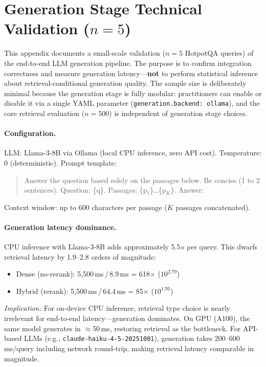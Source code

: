\documentclass[11pt,a4paper]{article}
\begin{document}


\section{Generation Stage Technical Validation ($n = 5$)}
\label{app:generation_pilot}

This appendix documents a small-scale validation ($n = 5$ HotpotQA queries)
of the end-to-end LLM generation pipeline.
The purpose is to confirm integration correctness and measure generation
latency---\textbf{not} to perform statistical inference about
retrieval-conditional generation quality.
The sample size is deliberately minimal because the generation stage is fully
modular: practitioners can enable or disable it via a single YAML parameter
(\texttt{generation.backend: ollama}), and the core retrieval evaluation
($n = 500$) is independent of generation stage choices.

\paragraph{Configuration.}
LLM: Llama-3-8B via Ollama (local CPU inference, zero API cost).
Temperature: 0 (deterministic).
Prompt template:
\begin{quote}\small\ttfamily
Answer the question based solely on the passages below.
Be concise (1 to 2 sentences).
Question: \{q\}. Passages: \{p$_1$\}\ldots\{p$_K$\}. Answer:
\end{quote}
Context window: up to 600 characters per passage ($K$ passages concatenated).

\paragraph{Generation latency dominance.}
CPU inference with Llama-3-8B adds approximately 5.5\,s per query.
This dwarfs retrieval latency by 1.9--2.8 orders of magnitude:
\begin{itemize}[leftmargin=*,topsep=2pt,itemsep=1pt]
  \item Dense (no-rerank): 5{,}500\,ms\,/\,8.9\,ms = 618$\times$
        ($10^{2.79}$)
  \item Hybrid (rerank): 5{,}500\,ms\,/\,64.4\,ms = 85$\times$
        ($10^{1.93}$)
\end{itemize}
\textit{Implication:} For on-device CPU inference, retrieval type choice is
nearly irrelevant for end-to-end latency---generation dominates.
On GPU (A100), the same model generates in $\approx$50\,ms, restoring
retrieval as the bottleneck.
For API-based LLMs (e.g., \texttt{claude-haiku-4-5-20251001}), generation takes
200--600\,ms/query including network round-trip, making retrieval latency
comparable in magnitude.
\end{document}
